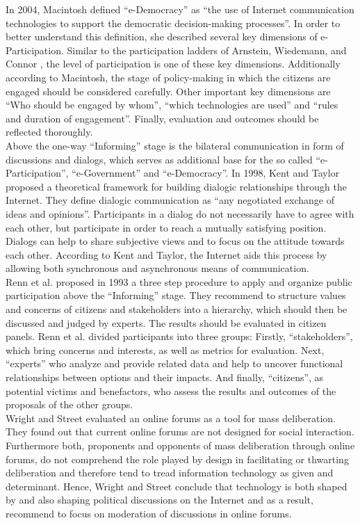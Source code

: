 In 2004, Macintosh \cite{Macintosh2004_eParticipation_characterization} defined ``e-Democracy'' as ``the use of Internet communication technologies to support the democratic decision-making processes''. In order to better understand this definition, she described several key dimensions of e-Participation. Similar to the participation ladders of Arnstein, Wiedemann, and Connor \cite{Arnstein1969_citizen_participation,Wiedemann1993355,Connor1988_new_ladder}, the level of participation is one of these key dimensions. Additionally according to Macintosh, the stage of policy-making in which the citizens are engaged should be considered carefully. Other important key dimensions are ``Who should be engaged by whom'', ``which technologies are used'' and ``rules and duration of engagement''. Finally, evaluation and outcomes should be reflected thoroughly.\\
Above the one-way ``Informing'' stage is the bilateral communication in form of discussions and dialogs, which serves as additional base for the so called ``e-Participation'', ``e-Government'' and ``e-Democracy''. In 1998, Kent and Taylor \cite{Kent1998_dialogic_relationships_through_www} proposed a theoretical framework for building dialogic relationships through the Internet. They define dialogic communication as ``any negotiated exchange of ideas and opinions''. Participants in a dialog do not necessarily have to agree with each other, but participate in order to reach a mutually satisfying position. Dialogs can help to share subjective views and to focus on the attitude towards each other. According to Kent and Taylor, the Internet aids this process by allowing both synchronous and asynchronous means of communication.\\
Renn et al. \cite{Renn1993_participation} proposed in 1993 a three step procedure to apply and organize public participation above the ``Informing'' stage. They recommend to structure values and concerns of citizens and stakeholders into a hierarchy, which should then be discussed and judged by experts. The results should be evaluated in citizen panels. Renn et al. divided participants into three groups: Firstly, ``stakeholders'', which bring concerns and interests, as well as metrics for evaluation. Next, ``experts'' who analyze and provide related data and help to uncover functional relationships between options and their impacts. And finally, ``citizens'', as potential victims and benefactors, who assess the results and outcomes of the proposals of the other groups.\\
Wright and Street \cite{Wright2007_deliberation_design} evaluated an online forums  as a tool for mass deliberation. They found out that current online forums are not designed for social interaction. Furthermore both, proponents and opponents of mass deliberation through online forums, do not comprehend the role played by design in facilitating or thwarting deliberation and therefore tend to tread information technology as given and determinant. Hence, Wright and Street conclude that technology is both shaped by and also shaping political discussions on the Internet and as a result, recommend to focus on moderation of discussions in online forums.\\
